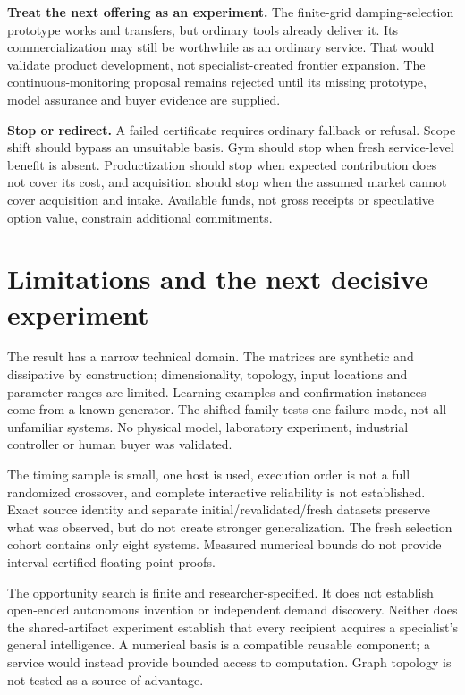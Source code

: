\documentclass[11pt,letterpaper]{article}
\begin{document}
\textbf{Treat the next offering as an experiment.} The finite-grid damping-selection prototype works and transfers, but ordinary tools already deliver it. Its commercialization may still be worthwhile as an ordinary service. That would validate product development, not specialist-created frontier expansion. The continuous-monitoring proposal remains rejected until its missing prototype, model assurance and buyer evidence are supplied.

\textbf{Stop or redirect.} A failed certificate requires ordinary fallback or refusal. Scope shift should bypass an unsuitable basis. Gym should stop when fresh service-level benefit is absent. Productization should stop when expected contribution does not cover its cost, and acquisition should stop when the assumed market cannot cover acquisition and intake. Available funds, not gross receipts or speculative option value, constrain additional commitments.

\section{Limitations and the next decisive experiment}

The result has a narrow technical domain. The matrices are synthetic and dissipative by construction; dimensionality, topology, input locations and parameter ranges are limited. Learning examples and confirmation instances come from a known generator. The shifted family tests one failure mode, not all unfamiliar systems. No physical model, laboratory experiment, industrial controller or human buyer was validated.

The timing sample is small, one host is used, execution order is not a full randomized crossover, and complete interactive reliability is not established. Exact source identity and separate initial/revalidated/fresh datasets preserve what was observed, but do not create stronger generalization. The fresh selection cohort contains only eight systems. Measured numerical bounds do not provide interval-certified floating-point proofs.

The opportunity search is finite and researcher-specified. It does not establish open-ended autonomous invention or independent demand discovery. Neither does the shared-artifact experiment establish that every recipient acquires a specialist's general intelligence. A numerical basis is a compatible reusable component; a service would instead provide bounded access to computation. Graph topology is not tested as a source of advantage.
\end{document}
